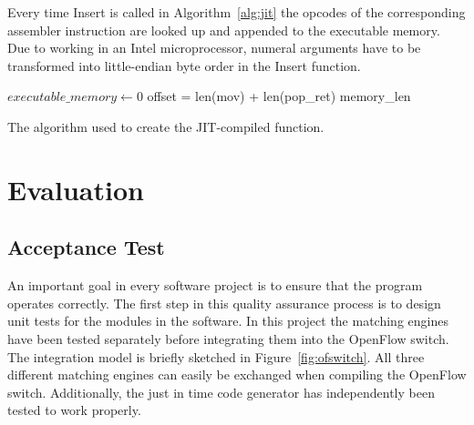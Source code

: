 \documentclass[a4paper,
		12pt,
		parskip=full,
		titlepage
		]{scrartcl}
\begin{document}
Every time \textsf{Insert} is called in Algorithm~\ref{alg:jit} the opcodes 
of the corresponding assembler instruction are looked up and appended to the executable memory.
Due to working in an Intel microprocessor, numeral arguments have to be 
transformed into little-endian byte order in the \textsf{Insert} function.

\begin{algorithm}
\begin{algorithmic}
        \State $executable\_memory \gets 0$
        \State {}
    \EndIf
        \State {}
        \State {} \Comment offset = len(mov) + len(pop\_ret)
        \State {}
        \State {}
            \State {}
            \State {}
        \Else
            \State {}
            \State {}
        \EndIf
        \State \Return memory\_len
    \EndIf
\EndFunction
\end{algorithmic}
\caption{The algorithm used to create the JIT-compiled function.}
\label{alg:jit}
\end{algorithm}

\section{Evaluation}
\subsection{Acceptance Test}
An important goal in every software project is to ensure that the program operates correctly.
The first step in this quality assurance process is to design unit tests for the modules in the software.
In this project the matching engines have been tested separately before integrating them into the OpenFlow switch.
The integration model is briefly sketched in Figure~\ref{fig:ofswitch}.
All three different matching engines can easily be exchanged when compiling the OpenFlow switch.
Additionally, the just in time code generator has independently been tested to work properly.
\end{document}
